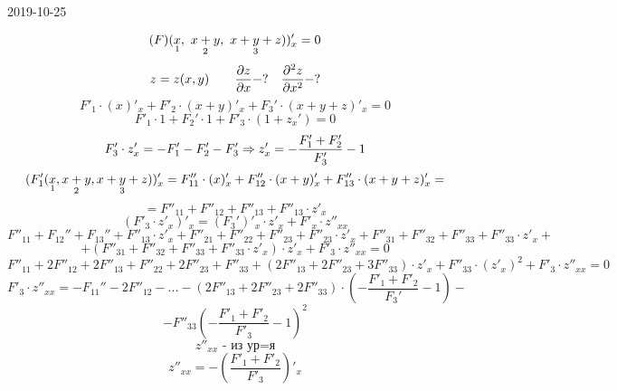 \documentclass[12pt, fleqn]{article}
\begin{document}
 
\begin{lect}{2019-10-25}
    \begin{Task} [3]
        \[(F)(\underset{1}{x}, \ \underset{2}{x + y}, \  \underset{3}{x + y + z}))'_x = 0\]
        \[z = z(x, y) \qquad \frac{\partial z}{\partial x} - ? \quad
         \frac{\partial ^2 z}{\partial x^2} - ?\]
         \[F'_1 \cdot (x)'_x + F'_2 \cdot (x + y)'_x + F_3' \cdot (x + y + z)'_x = 0\]
         \[F'_1 \cdot 1 + F_2' \cdot 1 + F'_3 \cdot (1 + z_x') = 0\]
         \[F'_3 \cdot z'_x = -F_1' - F'_2  - F'_3 \Rightarrow z'_x = -\frac{F'_1 + F'_2}{F'_3}
         - 1\]
         \[(F_1'(\underset{1}{x}, \underset{2}{x + y}, \underset{3}{x + y + z}))'_x = 
         F''_{11} \cdot (x)'_x + F''_{12} \cdot (x + y)'_x + F_{13}'' \cdot 
         (x + y + z)'_x =\]
         \[ = F''_{11} + F''_{12} + F''_{13} + F''_{13} \cdot z'_x\]
         \[(F'_3 \cdot z'_x)'_x = (F_3')'_{x} \cdot z'_x + F'_x \cdot z''_{xx}  \]
         \[F''_{11} + F_{12}'' + F_{13}'' + F''_{13} \cdot z'_x  + 
         F''_{21} + F''_{22} + F''_{23} + F''_{23} \cdot z'_x + 
         F''_{31} + F''_{32} + F''_{33} + F''_{33} \cdot z'_x + \]
         \[+ (F''_{31} + F''_{32} + F''_{33} + F''_{33}\cdot z'_x) \cdot z'_x  + 
         F'_3 \cdot z''_{xx} = 0 \]
         \[F''_{11} + 2F''_{12} + 2F''_{13} + F''_{22} + 2F''_{23} + F''_{33} + 
         (2F''_{13} + 2F''_{23} + 3F''_{33}  ) \cdot z'_x + F''_{33} \cdot(z'_x)^2 + 
         F'_3 \cdot z''_{xx} = 0 \]
         \[F'_3 \cdot z''_{xx} = -F_{11}'' - 2F''_{12} - ... - 
         (2F''_{13} + 2F''_{23} + 2F''_{33}) \cdot (- \frac{F'_1 + F'_2}{F_3'} - 1) - \]
         \[ - F''_{33} (-\frac{F'_1 + F'_2}{F'_3} - 1)^2 \]
         \[z''_{xx} \text{ - из ур=я} \]
         \[z''_{xx} = - (\frac{F'_1  + F'_2}{F'_3})'_x \]
    \end{Task}


\end{lect}
\end{document}
